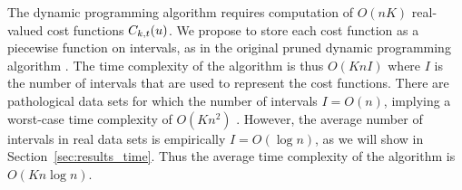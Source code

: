 \documentclass{article}
\begin{document}


The dynamic programming algorithm requires computation of $O(nK)$
real-valued cost functions $C_{k,t}(u)$. We propose to store each
cost function as a piecewise function on intervals, as in the original
pruned dynamic programming algorithm \citep{pruned-dp}. The time
complexity of the algorithm is thus $O(K n I)$ where $I$ is the number
of intervals that are used to represent the cost functions. There are
pathological data sets for which the number of intervals $I=O(n)$,
implying a worst-case time complexity of $O(K n^2)$
\citep{pruned-dp-new}. However, the average number of intervals in
real data sets is empirically $I=O(\log n)$, as we will show in
Section~\ref{sec:results_time}. Thus the average time complexity of
the algorithm is $O(K n \log n)$.
\end{document}
